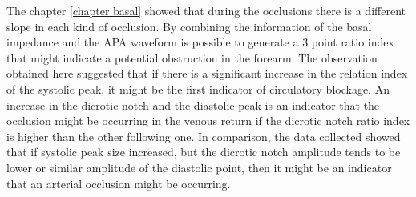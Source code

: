 The chapter \ref{chapter basal} showed that during the occlusions there is a different slope in each kind of occlusion. By combining the information of the basal impedance and the APA waveform is possible to generate a 3 point ratio index that might indicate a potential obstruction in the forearm. The observation obtained here suggested that if there is a significant increase in the relation index of the systolic peak, it might be the first indicator of circulatory blockage. An increase in the dicrotic notch and the diastolic peak is an indicator that the occlusion might be occurring in the venous return if the dicrotic notch ratio index is higher than the other following one. In comparison, the data collected showed that if systolic peak size increased, but the dicrotic notch amplitude tends to be lower or similar amplitude of the diastolic point, then it might be an indicator that an arterial occlusion might be occurring. 

    







